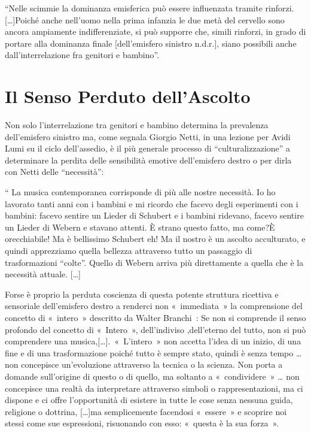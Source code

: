 “Nelle scimmie la dominanza emisferica  può essere influenzata tramite rinforzi.
[…]Poiché anche nell’uomo nella prima infanzia le due metà del cervello sono
ancora ampiamente indifferenziate, si può supporre che, simili rinforzi, in
grado di portare alla dominanza finale [dell’emisfero sinistro n.d.r.], siano
possibili anche dall’interrelazione fra genitori e bambino”.

\section{Il Senso Perduto dell’Ascolto}

Non solo l’interrelazione tra genitori e bambino determina  la prevalenza
dell’emisfero sinistro ma, come segnala  Giorgio Netti, in una lezione per
Avidi Lumi su  il ciclo dell'assedio, è il più generale processo di
“culturalizzazione” a determinare   la perdita delle sensibilità emotive
dell’emisfero destro o per dirla con Netti delle “necessità”:

“ La musica contemporanea corrisponde di più alle nostre necessità. Io ho
lavorato tanti anni con i bambini e mi ricordo  che facevo degli esperimenti
con i bambini: facevo sentire un Lieder di  Schubert e i bambini  ridevano,
facevo sentire un Lieder di Webern  e stavano attenti. È strano questo fatto, ma
come?È orecchiabile! Ma è bellissimo Schubert eh! Ma il nostro è un ascolto
acculturato, e quindi apprezziamo quella bellezza attraverso tutto un passaggio
di trasformazioni “colte”. Quello di Webern arriva più direttamente a quella che
è la necessità  attuale. […]

Forse è proprio  la perduta coscienza di questa potente struttura ricettiva e
sensoriale dell’emisfero destro  a renderci non « immediata » la comprensione
del concetto di « intero »  descritto da Walter Branchi : Se non si comprende il
senso profondo del concetto di « Intero », dell’indiviso ,dell’eterno del tutto,
non si può comprendere una musica,[…]. « L’intero » non accetta l’idea di un
inizio, di una fine e di una trasformazione poiché tutto è sempre stato, quindi
è senza tempo … non concepisce un’evoluzione attraverso la tecnica o la scienza.
Non porta a domande sull’origine di questo o di quello, ma soltanto a
« condividere » … non concepisce una realtà da interpretare attraverso simboli
o rappresentazioni, ma ci dispone e ci offre l’opportunità di esistere  in tutte
le cose senza nessuna guida, religione o dottrina, […]ma semplicemente facendosi
« essere » e scoprire noi stessi come sue espressioni, risuonando  con esso:
« questa è la sua forza ».

